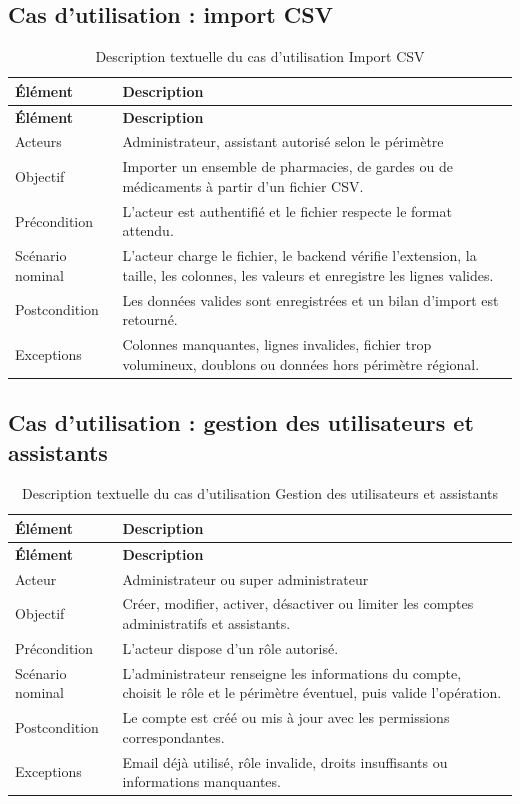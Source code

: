 \subsection{Cas d'utilisation : import CSV}

\begin{longtable}{L{4cm}L{10cm}}
    \caption{Description textuelle du cas d'utilisation Import CSV}\\
    \toprule
    \textbf{Élément} & \textbf{Description} \\
    \midrule
    \endfirsthead
    \toprule
    \textbf{Élément} & \textbf{Description} \\
    \midrule
    \endhead
    Acteurs & Administrateur, assistant autorisé selon le périmètre \\
    Objectif & Importer un ensemble de pharmacies, de gardes ou de médicaments à partir d'un fichier CSV. \\
    Précondition & L'acteur est authentifié et le fichier respecte le format attendu. \\
    Scénario nominal & L'acteur charge le fichier, le backend vérifie l'extension, la taille, les colonnes, les valeurs et enregistre les lignes valides. \\
    Postcondition & Les données valides sont enregistrées et un bilan d'import est retourné. \\
    Exceptions & Colonnes manquantes, lignes invalides, fichier trop volumineux, doublons ou données hors périmètre régional. \\
    \bottomrule
\end{longtable}

\subsection{Cas d'utilisation : gestion des utilisateurs et assistants}

\begin{longtable}{L{4cm}L{10cm}}
    \caption{Description textuelle du cas d'utilisation Gestion des utilisateurs et assistants}\\
    \toprule
    \textbf{Élément} & \textbf{Description} \\
    \midrule
    \endfirsthead
    \toprule
    \textbf{Élément} & \textbf{Description} \\
    \midrule
    \endhead
    Acteur & Administrateur ou super administrateur \\
    Objectif & Créer, modifier, activer, désactiver ou limiter les comptes administratifs et assistants. \\
    Précondition & L'acteur dispose d'un rôle autorisé. \\
    Scénario nominal & L'administrateur renseigne les informations du compte, choisit le rôle et le périmètre éventuel, puis valide l'opération. \\
    Postcondition & Le compte est créé ou mis à jour avec les permissions correspondantes. \\
    Exceptions & Email déjà utilisé, rôle invalide, droits insuffisants ou informations manquantes. \\
    \bottomrule
\end{longtable}

